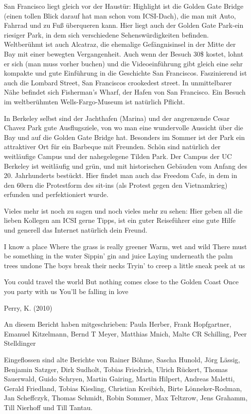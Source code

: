 \documentclass[a4paper]{scrreprt}
\begin{document}
San Francisco liegt gleich vor der Haustür: Highlight ist die Golden Gate Bridge (einen tollen Blick darauf hat man schon vom ICSI-Dach), die man mit Auto, Fahrrad und zu Fuß überqueren kann. Hier liegt auch der Golden Gate Park-ein riesiger Park, in dem sich verschiedene Sehenswürdigkeiten befinden. Weltberühmt ist auch Alcatraz, die ehemalige Gefängnisinsel in der Mitte der Bay mit einer bewegten Vergangenheit. Auch wenn der Besuch 30\$ kostet, lohnt er sich (man muss vorher buchen) und die Videoeinführung gibt gleich eine sehr kompakte und gute Einführung in die Geschichte San Franciscos. Faszinierend ist auch die Lombard Street, San Franciscos crookedest street. In unmittelbarer Nähe befindet sich Fisherman's Wharf, der Hafen von San Francisco. Ein Besuch im weltberühmten Wells-Fargo-Museum ist natürlich Pflicht.

In Berkeley selbst sind der Jachthafen (Marina) und der angrenzende Cesar Chavez Park gute Ausflugsziele, von wo man eine wundervolle Aussicht über die Bay und auf die Golden Gate Bridge hat. Besonders im Sommer ist der Park ein attraktiver Ort für ein Barbeque mit Freunden. Schön sind natürlich der weitläufige Campus und der nahegelegene Tilden Park. Der Campus der UC Berkeley ist weitläufig und grün, und mit historischen Gebäuden vom Anfang des 20. Jahrhunderts bestückt. Hier findet man auch das Freedom Cafe, in dem in den 60ern die Protestform des sit-ins (als Protest gegen den Vietnamkrieg) erfunden und perfektioniert wurde.

Vieles mehr ist noch zu sagen und noch vieles mehr zu sehen: Hier geben all die lieben Kollegen am ICSI gerne Tipps, ist ein guter Reiseführer eine gute Hilfe und generell das Internet natürlich dein Freund.

\clearpage

 


I know a place
Where the grass is really greener
Warm, wet and wild
There must be something in the water
Sippin' gin and juice
Laying underneath the palm trees undone
The boys break their necks
Tryin' to creep a little sneak peek at us

You could travel the world
But nothing comes close to the Golden Coast
Once you party with us
You'll be falling in love



Perry, K. (2010)

\clearpage

An diesem Bericht haben mitgeschrieben: Paula Herber, Frank Hopfgartner, Emanuel Kitzelmann,
Bernd T Meyer, Matthias Mnich, Malte CR Schilling, Peer Stelldinger

Eingeflossen sind alte Berichte von Rainer Böhme, Sascha Hunold, Jörg Lässig, Benjamin Satzger, Dirk Sudholt, Tobias Friedrich, Ulrich Rückert, Thomas Sauerwald, Guido Schryen, Martin Gairing, Martin Hilpert, Andreas Maletti, Gerald Friedland, Tobias Kiesling, Christian Kreibich, Birte Lönneker-Rodman, Jan Scheffczyk,
Thomas Schmidt, Robin Sommer, Max Teltzrow, Jens Grahamm, Till Nierhoff und Till Tantau.
\end{document}
